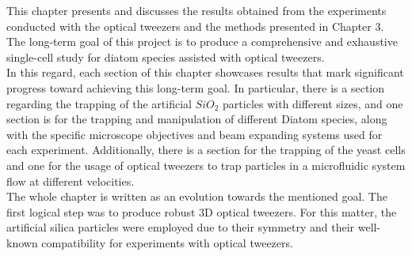 \documentclass[letterpaper,12pt,oneside]{book}
\begin{document}
This chapter presents and discusses the results obtained from the experiments conducted with the optical tweezers and the methods presented in Chapter 3. The long-term goal of this project is to produce a comprehensive and exhaustive single-cell study for diatom species assisted with optical tweezers. %
\\ In this regard, each section of this chapter showcases results that mark significant progress toward achieving this long-term goal. In particular, there is a section regarding the trapping of the artificial $SiO_2$ particles with different sizes, and one section is for the trapping and manipulation of different Diatom species, along with the specific microscope objectives and beam expanding systems used for each experiment. Additionally, there is a section for the trapping of the yeast cells and one for the usage of optical tweezers to trap particles in a microfluidic system flow at different velocities. 
\\The whole chapter is written as an evolution towards the mentioned goal. The first logical step was to produce robust 3D optical tweezers. For this matter, the artificial silica particles were employed due to their symmetry and their well-known compatibility for experiments with optical tweezers.



\end{document}
